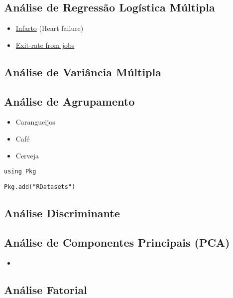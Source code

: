 \documentclass[12pt,a4paper]{article}
\begin{document}
\subsection{Análise de Regressão Logística Múltipla}
\label{sec:org6230365}
\begin{itemize}
\item \href{data/heart\_failure\_clinical\_records\_dataset.csv}{Infarto} (Heart failure)
\item \href{data/csv/Churn\_Modelling.csv}{Exit-rate from jobs}
\end{itemize}
\subsection{Análise de Variância Múltipla}
\label{sec:org0feb30f}
\subsection{Análise de Agrupamento}
\label{sec:orgb33dfdf}
\begin{itemize}
\item Carangueijos
\item Café
\item Cerveja
\end{itemize}

\begin{verbatim}
using Pkg
\end{verbatim}

\begin{verbatim}
Pkg.add("RDatasets")
\end{verbatim}


\subsection{Análise Discriminante}
\label{sec:org37065b7}
\subsection{Análise de Componentes Principais (PCA)}
\label{sec:orgdea26dc}
\begin{itemize}
\item 
\end{itemize}
\subsection{Análise Fatorial}
\label{sec:orgde7d839}
\end{document}
